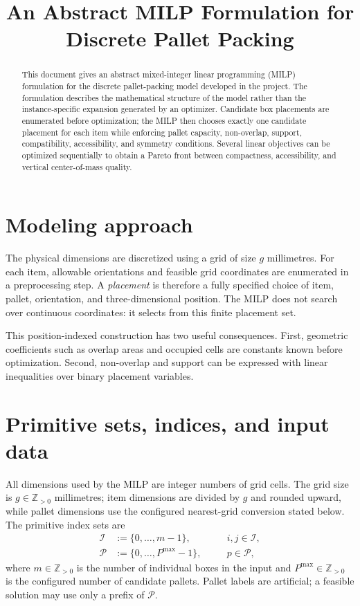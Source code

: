 \documentclass[11pt]{article}
\title{An Abstract MILP Formulation for Discrete Pallet Packing}
\author{}
\date{}
\newcommand{\Item}{\mathcal{I}}
\newcommand{\Pallet}{\mathcal{P}}
\begin{document}
\maketitle

\begin{abstract}
This document gives an abstract mixed-integer linear programming (MILP)
formulation for the discrete pallet-packing model developed in the project.
The formulation describes the mathematical structure of the model rather than
the instance-specific expansion generated by an optimizer.  Candidate box
placements are enumerated before optimization; the MILP then chooses exactly
one candidate placement for each item while enforcing pallet capacity,
non-overlap, support, compatibility, accessibility, and symmetry conditions.
Several linear objectives can be optimized sequentially to obtain a Pareto
front between compactness, accessibility, and vertical center-of-mass quality.
\end{abstract}

\section{Modeling approach}

The physical dimensions are discretized using a grid of size $g$ millimetres.
For each item, allowable orientations and feasible grid coordinates are
enumerated in a preprocessing step.  A \emph{placement} is therefore a fully
specified choice of item, pallet, orientation, and three-dimensional position.
The MILP does not search over continuous coordinates: it selects from this
finite placement set.

This position-indexed construction has two useful consequences.  First,
geometric coefficients such as overlap areas and occupied cells are constants
known before optimization.  Second, non-overlap and support can be expressed
with linear inequalities over binary placement variables.

\section{Primitive sets, indices, and input data}

All dimensions used by the MILP are integer numbers of grid cells.  The grid
size is $g\in\mathbb Z_{>0}$ millimetres; item dimensions are divided by $g$
and rounded upward, while pallet dimensions use the configured nearest-grid
conversion stated below.  The primitive index sets are
\begin{align}
  \Item &:= \{0,\ldots,m-1\},
  &\quad& i,j\in\Item,
  \label{eq:item-set}\\
  \Pallet &:= \{0,\ldots,P^{\max}-1\},
  && p\in\Pallet,
  \label{eq:pallet-set}
\end{align}
where $m\in\mathbb Z_{>0}$ is the number of individual boxes in the input and
$P^{\max}\in\mathbb Z_{>0}$ is the configured number of candidate pallets.
Pallet labels are artificial; a feasible solution may use only a prefix of
$\Pallet$.
\end{document}
